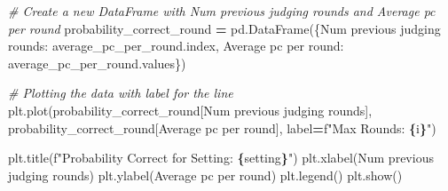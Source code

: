 \documentclass[
]{article}
\newenvironment{Shaded}{\begin{snugshade}}{\end{snugshade}}
\newcommand{\CommentTok}[1]{\textcolor[rgb]{0.56,0.35,0.01}{\textit{#1}}}
\newcommand{\NormalTok}[1]{#1}
\newcommand{\OperatorTok}[1]{\textcolor[rgb]{0.81,0.36,0.00}{\textbf{#1}}}
\newcommand{\SpecialCharTok}[1]{\textcolor[rgb]{0.81,0.36,0.00}{\textbf{#1}}}
\newcommand{\SpecialStringTok}[1]{\textcolor[rgb]{0.31,0.60,0.02}{#1}}
\newcommand{\StringTok}[1]{\textcolor[rgb]{0.31,0.60,0.02}{#1}}
\begin{document}
\begin{Shaded}
\begin{Highlighting}[]
      \CommentTok{\# Create a new DataFrame with \textquotesingle{}Num previous judging rounds\textquotesingle{} and \textquotesingle{}Average pc per round\textquotesingle{}}
\NormalTok{      probability\_correct\_round }\OperatorTok{=}\NormalTok{ pd.DataFrame(\{}\StringTok{\textquotesingle{}Num previous judging rounds\textquotesingle{}}\NormalTok{: average\_pc\_per\_round.index,}
                                                \StringTok{\textquotesingle{}Average pc per round\textquotesingle{}}\NormalTok{: average\_pc\_per\_round.values\})}
  
      \CommentTok{\# Plotting the data with label for the line}
\NormalTok{      plt.plot(probability\_correct\_round[}\StringTok{\textquotesingle{}Num previous judging rounds\textquotesingle{}}\NormalTok{], probability\_correct\_round[}\StringTok{\textquotesingle{}Average pc per round\textquotesingle{}}\NormalTok{], label}\OperatorTok{=}\SpecialStringTok{f"Max Rounds: }\SpecialCharTok{\{}\NormalTok{i}\SpecialCharTok{\}}\SpecialStringTok{"}\NormalTok{)}
  
\NormalTok{  plt.title(}\SpecialStringTok{f"Probability Correct for Setting: }\SpecialCharTok{\{}\NormalTok{setting}\SpecialCharTok{\}}\SpecialStringTok{"}\NormalTok{) }
\NormalTok{  plt.xlabel(}\StringTok{\textquotesingle{}Num previous judging rounds\textquotesingle{}}\NormalTok{)}
\NormalTok{  plt.ylabel(}\StringTok{\textquotesingle{}Average pc per round\textquotesingle{}}\NormalTok{)}
\NormalTok{  plt.legend()}
\NormalTok{  plt.show()}
\end{Highlighting}
\end{Shaded}
\end{document}

